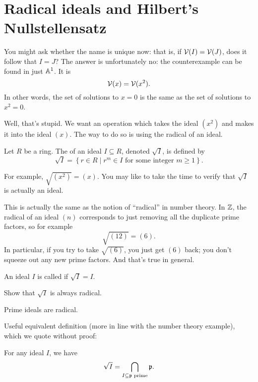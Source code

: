 \section{Radical ideals and Hilbert's Nullstellensatz}
You might ask whether the name is unique now:
that is, if $\mathcal V(I) = \mathcal V(J)$, does it follow that $I=J$?
The answer is unfortunately no: the counterexample can be found in just $\mathbb A^1$.
It is
\[ \mathcal V(x) = \mathcal V(x^2). \]
In other words, the set of solutions to $x=0$ is the same as the set of solutions to $x^2=0$.

Well, that's stupid.
We want an operation which takes the ideal $(x^2)$ and makes it into the ideal $(x)$.
The way to do so is using the radical of an ideal.

\begin{definition}
	Let $R$ be a ring.
	The  of an ideal $I \subseteq R$, denoted $\sqrt I$,
	is defined by
	\[
		\sqrt I =
		\left\{ r \in R
			\mid r^m \in I \text{ for some integer $m \ge 1$}  \right\}. 
	\]
\end{definition}
For example, $\sqrt{(x^2)} = (x)$.
You may like to take the time to verify that $\sqrt I$ is actually an ideal.

This is actually the same as the notion of ``radical'' in number theory.
In $\mathbb Z$, the radical of an ideal $(n)$ corresponds to just
removing all the duplicate prime factors, so for example
\[ \sqrt{(12)} = (6). \]
In particular, if you try to take $\sqrt{(6)}$, you just get $(6)$ back;
you don't squeeze out any new prime factors.
And that's true in general.

\begin{definition}
	An ideal $I$ is called  if $\sqrt I = I$.
\end{definition}
\begin{ques}
	Show that $\sqrt I$ is always radical.
\end{ques}
\begin{ques}
	Prime ideals are radical.
\end{ques}
Useful equivalent definition
(more in line with the number theory example),
which we quote without proof:
\begin{theorem}
	For any ideal $I$, we have
	\[ \sqrt I = \bigcap_{I \subseteq \mathfrak p \text{ prime}} \mathfrak p. \]
\end{theorem}

